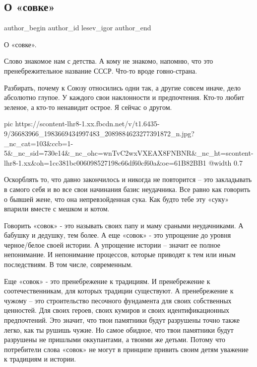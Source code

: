  
 
 
 
 
 
\subsection{О «совке»}
\label{sec:05_07_2018.fb.lesev_igor.1.o_sovke}
 
\ifcmt
 author_begin
   author_id lesev_igor
 author_end
\fi

О «совке».

Слово знакомое нам с детства. А кому не знакомо, напомню, что это
пренебрежительное название СССР. Что-то вроде говно-страна.

Разбирать, почему к Союзу относились одни так, а другие совсем иначе, дело
абсолютно глупое. У каждого свои наклонности и предпочтения. Кто-то любит
зеленое, а кто-то ненавидит острое. Я сейчас о другом.

\ifcmt
  pic https://scontent-lhr8-1.xx.fbcdn.net/v/t1.6435-9/36683966_1983669434997483_2089884623277391872_n.jpg?_nc_cat=103&ccb=1-5&_nc_sid=730e14&_nc_ohc=wnTvC2wxVXEAX8FNBNR&_nc_ht=scontent-lhr8-1.xx&oh=1cc381bc006098527198c66df60cf60a&oe=61B82BB1
  @width 0.7
\fi

Оскорблять то, что давно закончилось и никогда не повторится – это закладывать
в самого себя и во все свои начинания базис неудачника. Все равно как говорить
о бывшей жене, что она непревзойденная сука. Как будто тебе эту «суку» впарили
вместе с мешком и котом.

Говорить «совок» - это называть своих папу и маму сраными неудачниками. А
бабушку и дедушку, тем более. А еще «совок» - это упрощение до уровня
черное/белое своей истории. А упрощение истории – значит ее полное непонимание.
И непонимание процессов, которые приводят к тем или иным последствиям. В том
числе, современным.

Еще «совок» - это пренебрежение к традициям. И пренебрежение к
соотечественникам, для которых традиции существуют. А пренебрежение к чужому –
это строительство песочного фундамента для своих собственных ценностей. Для
своих героев, своих кумиров и своих идентификационных предпочтений. Это значит,
что твои памятники будут разрушены точно также легко, как ты рушишь чужие. Но
самое обидное, что твои памятники будут разрушены не пришлыми оккупантами, а
твоими же детьми. Потому что потребители слова «совок» не могут в принципе
привить своим детям уважение к традициям и истории.

